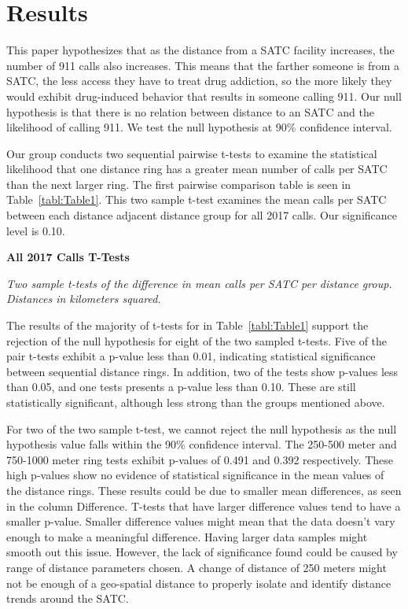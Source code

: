 \documentclass[12pt]{article}
\begin{document}
\section{Results}
\label{sec:result}

This paper hypothesizes that as the distance from a SATC facility increases, the number of 911 calls also increases. This means that the farther someone is from a SATC, the less access they have to treat drug addiction, so the more likely they would exhibit drug-induced behavior that results in someone calling 911. Our null hypothesis is that there is no relation between distance to an SATC and the likelihood of calling 911. We test the null hypothesis at 90\% confidence interval. 

Our group conducts two sequential pairwise t-tests to examine the statistical likelihood that one distance ring has a greater mean number of calls per SATC than the next larger ring. The first pairwise comparison table is seen in Table~\ref{tabl:Table1}. This two sample t-test examines the mean calls per SATC between each distance adjacent distance group for all 2017 calls. Our significance level is 0.10.

\begin{table}[htbp]
\begin{center}

\end{center}

\caption{\textbf{All 2017 Calls T-Tests}}
\label{tabl:Table1}
\centering\textit{Two sample t-tests of the difference in mean calls per SATC per distance group.}
\textit{Distances in kilometers squared.}
\end{table}


The results of the majority of t-tests for in Table~\ref{tabl:Table1} support the rejection of the null hypothesis for eight of the two sampled t-tests. Five of the pair t-tests exhibit a p-value less than 0.01, indicating statistical significance between sequential distance rings. In addition, two of the tests show p-values less than 0.05, and one tests presents a p-value less than 0.10. These are still statistically significant, although less strong than the groups mentioned above. 

For two of the two sample t-test, we cannot reject the null hypothesis as the null hypothesis value falls within the 90\% confidence interval. The 250-500 meter and 750-1000 meter ring tests exhibit p-values of 0.491 and 0.392 respectively. These high p-values show no evidence of statistical significance in the mean values of the distance rings. These results could be due to smaller mean differences, as seen in the column Difference. T-tests that have larger difference values tend to have a smaller p-value. Smaller difference values might mean that the data doesn't vary enough to make a meaningful difference. Having larger data samples might smooth out this issue. However, the lack of significance found could be caused by range of distance parameters chosen. A change of distance of 250 meters might not be enough of a geo-spatial distance to properly isolate and identify distance trends around the SATC.
\end{document}
